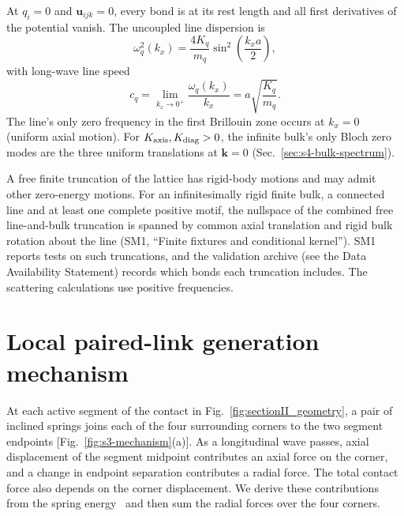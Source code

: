 \documentclass[10pt,aps,onecolumn,floatfix,notitlepage,nofootinbib,showkeys]{revtex4-2}
\newcommand{\vk}{\bm{k}}
\newcommand{\vu}{\bm{u}}
\begin{document}
At $q_i=0$ and $\vu_{ijk}=0$, every bond is at its rest length and all first derivatives of the potential vanish. The uncoupled line dispersion is
\begin{equation}
  \omega_q^2(k_x)
  =\frac{4K_q}{m_q}
   \sin^2\!\left(\frac{k_xa}{2}\right),
  \label{eq:s2-line-dispersion}
\end{equation}
with long-wave line speed
\begin{equation}
  c_q=\lim_{k_x\to0^+}\frac{\omega_q(k_x)}{k_x}
  =a\sqrt{\frac{K_q}{m_q}}.
  \label{eq:s2-line-speed}
\end{equation}
The line's only zero frequency in the first Brillouin zone occurs at $k_x=0$ (uniform axial motion). For $K_{\rm axis},K_{\rm diag}>0$, the infinite bulk's only Bloch zero modes are the three uniform translations at $\vk=0$ (Sec.~\ref{sec:s4-bulk-spectrum}).

A free finite truncation of the lattice has rigid-body motions and may admit other zero-energy motions. For an infinitesimally rigid finite bulk, a connected line and at least one complete positive motif, the nullspace of the combined free line-and-bulk truncation is spanned by common axial translation and rigid bulk rotation about the line (SM1, ``Finite fixtures and conditional kernel''). SM1 reports tests on such truncations, and the validation archive (see the Data Availability Statement) records which bonds each truncation includes. The scattering calculations use positive frequencies.



\section{Local paired-link generation mechanism}
\label{sec:s3-mechanism}

At each active segment of the contact in Fig.~\ref{fig:sectionII_geometry}, a pair of inclined springs joins each of the four surrounding corners to the two segment endpoints [Fig.~\ref{fig:s3-mechanism}(a)]. As a longitudinal wave passes, axial displacement of the segment midpoint contributes an axial force on the corner, and a change in endpoint separation contributes a radial force. The total contact force also depends on the corner displacement. We derive these contributions from the spring energy~\cite{BornHuang1954,Maradudin1971} and then sum the radial forces over the four corners.
\end{document}
